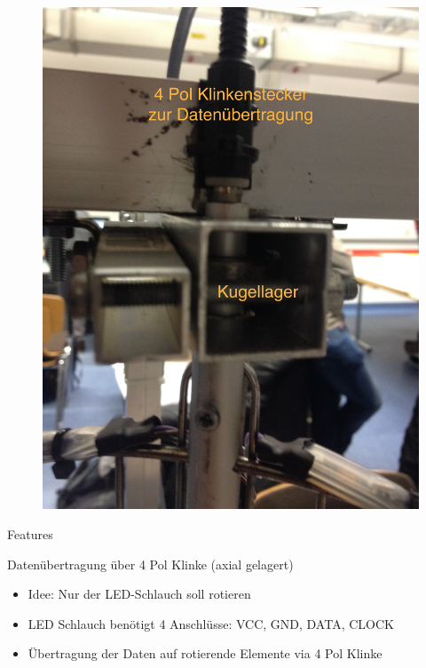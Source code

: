\begin{frame}{}
\vspace*{-.5cm}
\begin{figure}
\center
\includegraphics[height=\textheight]{Plots/Klinke}
\end{figure}
\end{frame}

\begin{frame}{Features}
\begin{exampleblock}{}
Datenübertragung über 4 Pol Klinke (axial gelagert)
\begin{itemize}
\item Idee: Nur der LED-Schlauch soll rotieren
\item LED Schlauch benötigt 4 Anschlüsse: VCC, GND, DATA, CLOCK 
\item Übertragung der Daten auf rotierende Elemente via 4 Pol Klinke
\end{itemize}
\end{exampleblock}
\end{frame}


